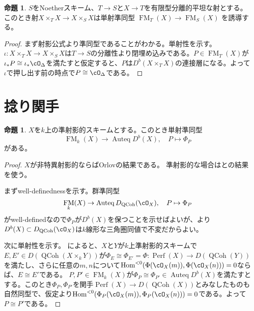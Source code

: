 \documentclass[uplatex, a4paper, dvipdfmx]{jsarticle}
\theoremstyle{definition}
\newtheorem{proposition}[theorem]{命題}
\DeclareMathOperator{\Hom}{\mathrm{Hom}}
\DeclareMathOperator{\Auteq}{\mathrm{Auteq}}
\DeclareMathOperator{\Perf}{\mathrm{Perf}}
\DeclareMathOperator{\QCoh}{\mathrm{QCoh}}
\DeclareMathOperator{\FM}{\mathrm{FM}}
\begin{document}
\begin{proposition}
    $S$をNoetherスキーム、$T \to S$と$X \to T$を有限型分離的平坦な射とする。このとき射$X \times_T X \to X \times_S X$は単射準同型
    $\FM_{T}(X) \to \FM_{S}(X)$
    を誘導する。
\end{proposition}
\begin{proof}
    まず射影公式より準同型であることがわかる。単射性を示す。
    $\iota \colon X \times_T X \to X \times_S X$は$T \to S$の分離性より閉埋め込みである。$P \in \FM_T (X)$が$\iota_*P \cong \iota_*\cO_\Delta$を満たすと仮定すると、$P$は$D^b(X \times_T X)$の連接層になる。よって$\iota$で押し出す前の時点で$P \cong \cO_\Delta$である。
\end{proof}
\section{捻り関手}
\begin{proposition}\label{prop:kernel-to-functor}
    $X$を$k$上の準射影的スキームとする。このとき単射準同型
    \begin{equation}
        \FM_k(X) \to \Auteq D^b(X), \quad P \mapsto \Phi_P
    \end{equation}
    がある。
\end{proposition}
\begin{proof}
    $X$が非特異射影的ならばOrlovの結果である。
    準射影的な場合は\cite{MR2434186}と\cite{MR3556457}の結果を使う。

    まずwell-definednessを示す。群準同型
    \begin{equation}
        \FM_k(X) \to \Auteq D_{\QCoh}(\cO_X), \quad P \mapsto \Phi_P
    \end{equation}
    がwell-definedなので$\Phi_P$が$D^b(X)$を保つことを示せばよいが、\cite[Lemma 6.11, Proposition 6.12]{MR2434186}より$D^b(X) \subset D_{\QCoh}(\cO_X)$は$k$線形な三角圏同値で不変だからよい。

    次に単射性を示す。
    \cite[Remark 1.3, Theorem 1.5]{MR3556457}によると、$X$と$Y$が$k$上準射影的スキームで$E, E' \in D(\QCoh(X \times_k Y))$が$\Phi_E \cong \Phi_{E'} = \Phi \colon \Perf(X) \to D(\QCoh(Y))$を満たし、さらに任意の$m, n$について$\Hom^{<0}(\Phi(\cO_X(m)), \Phi(\cO_X(n))) = 0$ならば、$E \cong E'$である。
    $P, P' \in \FM_k(X)$が$\Phi_P \cong \Phi_{P'} \in \Auteq D^b(X)$を満たすとする。このとき$\Phi_P, \Phi_{P'}$を関手$\Perf(X) \to D(\QCoh(X))$とみなしたものも自然同型で、仮定より$\Hom^{<0}(\Phi_P(\cO_X(m)), \Phi_P(\cO_X(n))) = 0$である。よって$P \cong P'$である。
\end{proof}
\end{document}

